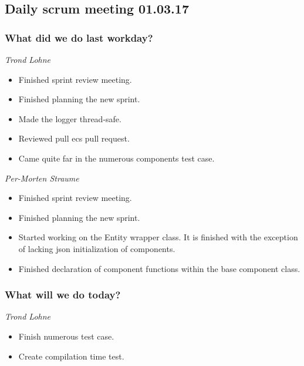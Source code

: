 \documentclass{article}
\begin{document}
\begin{center}
\subsection*{Daily scrum meeting 01.03.17}
\end{center}
\bigskip


\subsubsection*{What did we do last workday?}

\noindent\textit{Trond Lohne}
\begin{itemize}
	\item 
	Finished sprint review meeting.
	
	\item 
	Finished planning the new sprint.
	
	\item 
	Made the logger thread-safe.

    \item
    Reviewed pull ecs pull request.

    \item
    Came quite far in the numerous components test case.
\end{itemize}

\medskip

\noindent\textit{Per-Morten Straume}
\begin{itemize}
	\item 
	Finished sprint review meeting.
	
	\item 
	Finished planning the new sprint.
	
	\item 
	Started working on the Entity wrapper class.
    It is finished with the exception of lacking json initialization of components.

    \item
    Finished declaration of component functions within the base component class.
\end{itemize}


\subsubsection*{What will we do today?}

\noindent\textit{Trond Lohne}
\begin{itemize}
	\item 
	Finish numerous test case.
	
	\item 
	Create compilation time test.
\end{itemize}
\end{document}
